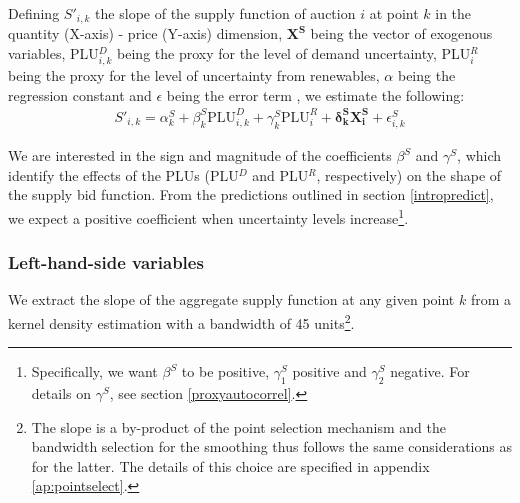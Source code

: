 Defining $S'_{i,k}$ the slope of the supply function of auction $i$ at point $k$ in the quantity (X-axis) - price (Y-axis) dimension, %
$\boldsymbol{X^S}$ being the vector of exogenous variables, PLU$^D_{i,k}$ being the proxy for the level of demand uncertainty, PLU$^R_i$ being the proxy for the level of uncertainty from renewables, $\alpha$ being the regression constant and $\epsilon$ being the error term%
, we estimate the following:
\begin{eqnarray}
\label{secondstagereg2}
S'_{i,k} =\alpha_{k}^S+ \beta_{k}^S \text{PLU}^D_{i,k} + \gamma_{k}^S \text{PLU}^R_{i} + \boldsymbol{\delta_{k}^S X^S_i}+\epsilon_{i,k}^S
\end{eqnarray}

We are interested in the sign and magnitude of the coefficients $\beta^S$ and $\gamma^S$, which identify the effects of the PLUs (PLU$^D$ and PLU$^R$, respectively) on the shape of the supply bid function. From the predictions outlined in section \ref{intropredict}, we expect a positive coefficient when uncertainty levels increase\footnote{Specifically, we want $\beta^S$ to be positive, $\gamma^S_1$ positive and $\gamma^S_2$ negative. For details on $\gamma^S$, see section \ref{proxyautocorrel}.}. %




\subsubsection{Left-hand-side variables}
\label{LHS}
We extract the slope of the aggregate supply function at any given point $k$ from a kernel density estimation with a bandwidth of 45 units\footnote{The
slope is a by-product of the point selection mechanism and the bandwidth selection for the smoothing thus follows the same considerations as for the latter. The details of this choice are specified in appendix \ref{ap:pointselect}.}.  

